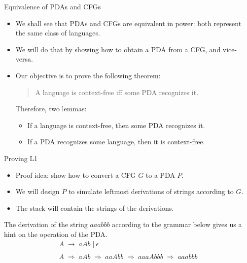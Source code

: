 \documentclass{prosper}%
\newcommand{\e} {{\mbox{$\epsilon$}}}
\newcommand{\ra}{\mbox{$\;\rightarrow\;$}}
\newcommand{\vb}{\mbox{$\;|\:$}}
\newcommand{\dra}{\mbox{$\;\Rightarrow\;$}}
\begin{document}
\begin{comment}
\begin{slide}{PDA conversion: example}
Consider the PDA $P$ below and its language $L_f(P)$. Convert $P$ to another PDA $P_1$ that accepts by empty stack such that $L_f(P)=L_e(P_1)$
\begin{center}
\texttt{[image: figures/pda2new.eps]}
\end{center}
\end{slide}
\end{comment}

\begin{slide}{Equivalence of PDAs and CFGs}
\begin{itemize}
\item We shall see that PDAs and CFGs are equivalent in power: both represent the same class of languages.
\item We will do that by showing how to obtain a PDA from a CFG, and vice-versa.
\item Our objective is to prove the following theorem:
{\em \begin{quote}
A language is context-free {\large\blue iff} some PDA recognizes it.
\end{quote}}
Therefore, two lemmas:
\begin{itemize}
\item[{\blue\bf L1}:] If a language is context-free, then some PDA recognizes it.
\item[{\blue\bf L2}:] If a PDA recognizes some language, then it is context-free.
\end{itemize}
\end{itemize}
\end{slide}

\begin{slide}{Proving L1}
\begin{itemize}
\item Proof idea: show how to convert a CFG $G$ to a PDA $P$.
\item We will design $P$ to simulate leftmost derivations of strings according to $G$.
\item The stack will contain the strings of the derivations.
\end{itemize}
The derivation of the string $aaabbb$ according to the grammar below gives us a hint on the operation of the PDA.
\[
\begin{array}{l}
A\ra aAb \vb \e\\\ \\
A\dra aAb\dra aaAbb \dra aaaAbbb \dra aaabbb
\end{array}
\]
\end{slide}
\end{document}
